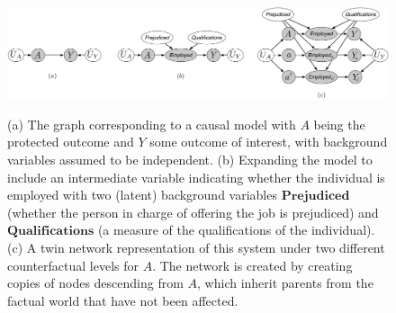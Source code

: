 \begin{figure}[th!]
\begin{center}
\vspace{-1ex}
\centerline{\includegraphics[width=\textwidth]{implications_fig.pdf}}
\vspace{-2ex}
\label{fig:ex1}
  \caption{(a) The graph corresponding to a causal model with $A$ being the protected outcome
    and $Y$ some outcome of interest, with background variables assumed to be independent.
    (b) Expanding the model to include an intermediate variable indicating whether the individual
    is employed with two (latent) background variables $\textbf{Prejudiced}$ (whether the person in charge
    of offering the job is prejudiced) and $\textbf{Qualifications}$ (a measure of the qualifications of
    the individual). (c) A twin network representation of this system \citep{pearl:00}
    under two different counterfactual levels for $A$. The network is created by creating copies
    of nodes descending from $A$, which inherit parents from the factual world that have not
    been affected.}
\vspace{-2ex}
\end{center}

\end{figure}
